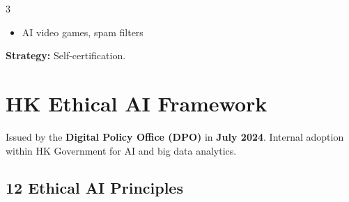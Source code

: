 \documentclass[a4paper,7pt]{extarticle}
\begin{document}
\begin{multicols}{3}
\begin{infobox}
\begin{itemize}
  \item AI video games, spam filters
\end{itemize}
\textbf{Strategy:} Self-certification.
\end{infobox}

\section{HK Ethical AI Framework}

\begin{infobox}
Issued by the \textbf{Digital Policy Office (DPO)} in \textbf{July 2024}. Internal adoption within HK Government for AI and big data analytics.
\end{infobox}

\subsection{12 Ethical AI Principles}


\end{multicols}
\end{document}
